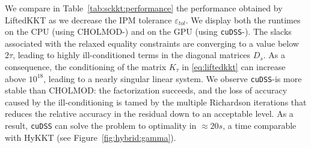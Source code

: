 We compare in Table~\ref{tab:sckkt:performance} the performance obtained by LiftedKKT
as we decrease the IPM tolerance $\varepsilon_{tol}$.
We display both the runtimes on the CPU (using CHOLMOD-\ldlt) and on the GPU (using {\tt cuDSS}-\ldlt).
The slacks associated with the relaxed equality constraints are converging to a value below $2 \tau$,
leading to highly ill-conditioned terms in the diagonal matrices $D_s$.
As a consequence, the conditioning of the matrix $K_\tau$ in \eqref{eq:liftedkkt} can increase
above $10^{18}$, leading to a nearly singular linear system.
We observe {\tt cuDSS}-\ldlt is more stable than CHOLMOD: the factorization
succeeds, and the loss of accuracy caused by the ill-conditioning is tamed by the multiple
Richardson iterations that reduces the relative accuracy in the residual down to an acceptable level.
As a result, {\tt cuDSS} can solve
the problem to optimality in $\approx 20s$, a time comparable with HyKKT (see Figure~\ref{fig:hybrid:gamma}).

